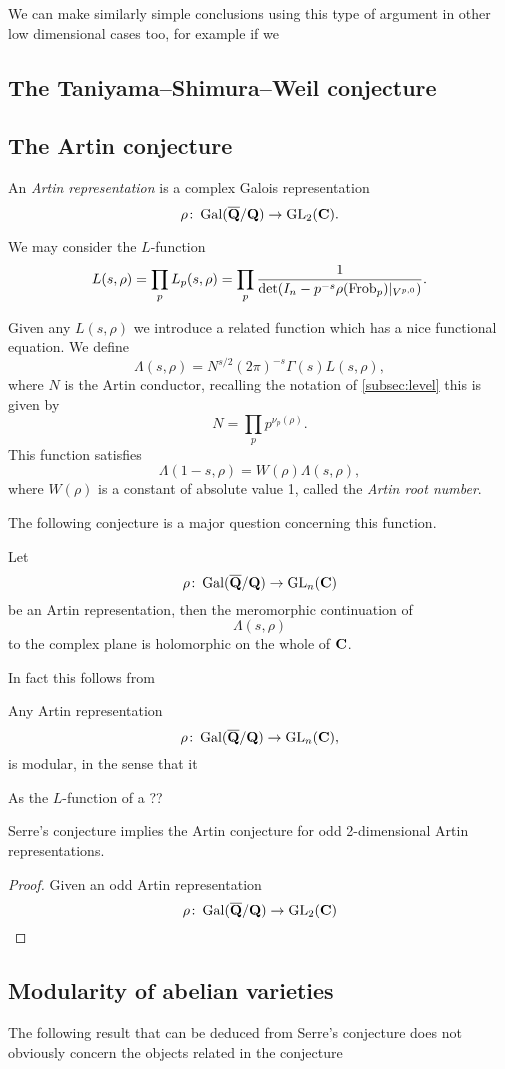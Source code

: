 \documentclass[a4paper,12pt]{article}
\begin{document}
We can make similarly simple conclusions using this type of argument in other low dimensional cases too, for example if we 


\subsection{The Taniyama--Shimura--Weil conjecture}\label{sec:tan}


\subsection{The Artin conjecture}\label{sec:artin}
\begin{defn}
An \emph{Artin representation} is a complex Galois representation
\[
\rho\colon \operatorname{Gal}(\overline{\mathbf{Q}}/\mathbf{Q}) \to \operatorname{GL}_2(\mathbf{C}).
\]
\end{defn}

We may consider the $L$-function
\[
L(s, \rho) = \prod_{p} L_p(s,\rho) = \prod_{p} \frac{1}{\det(I_n - p^{-s}\rho(\operatorname{Frob}_p) |_{V^{p,0}})}.
\]

Given any $L(s,\rho)$ we introduce a related function which has a nice functional equation.
We define
\[
\Lambda(s, \rho) = N^{s/2} (2\pi)^{-s} \Gamma(s)L(s,\rho),
\]
where $N$ is the Artin conductor, recalling the notation of \cref{subsec:level} this is given by
\[
N = \prod_{p}p^{\nu_p(\rho)}.
\]
This function satisfies
\[
\Lambda(1-s, \rho) = W(\rho)\Lambda(s,\rho),
\]
where $W(\rho)$ is a constant of absolute value 1, called the \emph{Artin root number}.

The following conjecture is a major question concerning this function.

\begin{conjecture}
Let
\[
\rho\colon \operatorname{Gal}(\overline{\mathbf{Q}}/\mathbf{Q}) \to \operatorname{GL}_n(\mathbf{C})
\]
be an Artin representation, then the meromorphic continuation of
\[
\Lambda(s,\rho)
\]
to the complex plane is holomorphic on the whole of $\mathbf{C}$.
\end{conjecture}

In fact this follows from

\begin{conjecture}
Any Artin representation
\[
\rho\colon \operatorname{Gal}(\overline{\mathbf{Q}}/\mathbf{Q}) \to \operatorname{GL}_n(\mathbf{C}),
\]
is modular, in the sense that it
\end{conjecture}

As the $L$-function of a ??

\begin{prop}
Serre's conjecture implies the Artin conjecture for odd 2-dimensional Artin representations.
\end{prop}
\begin{proof}
Given an odd Artin representation
\[
\rho\colon \operatorname{Gal}(\overline{\mathbf{Q}}/\mathbf{Q})\to \operatorname{GL}_2(\mathbf{C})
\]

\end{proof}


\subsection{Modularity of abelian varieties}
The following result that can be deduced from Serre's conjecture does not obviously concern the objects related in the conjecture




\end{document}
